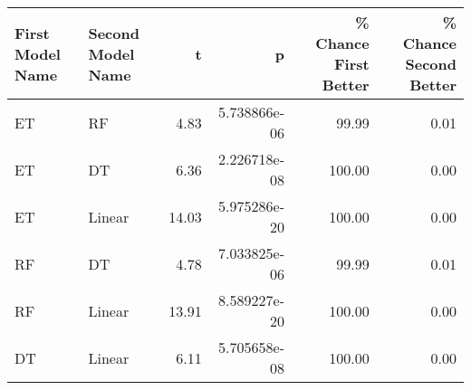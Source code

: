 \begin{tabular}{llrrrr}
\toprule
First Model Name & Second Model Name &     t &            p &  \% Chance First Better &  \% Chance Second Better \\
\midrule
              ET &                RF &  4.83 & 5.738866e-06 &                  99.99 &                    0.01 \\
              ET &                DT &  6.36 & 2.226718e-08 &                 100.00 &                    0.00 \\
              ET &            Linear & 14.03 & 5.975286e-20 &                 100.00 &                    0.00 \\
              RF &                DT &  4.78 & 7.033825e-06 &                  99.99 &                    0.01 \\
              RF &            Linear & 13.91 & 8.589227e-20 &                 100.00 &                    0.00 \\
              DT &            Linear &  6.11 & 5.705658e-08 &                 100.00 &                    0.00 \\
\bottomrule
\end{tabular}

